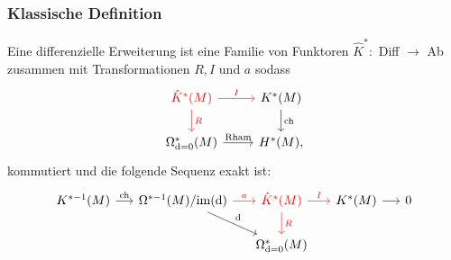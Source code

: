\documentclass[12pt,utf8,notheorems,compress,t]{beamer}
\renewcommand{\_}{\mathpunct{.}}
\newcommand{\?}{\,{:}\,}
\newcommand{\dd}{\textup{d}}
\begin{document}
\begin{frame}\frametitle{Klassische Definition}
    Eine differenzielle Erweiterung ist eine Familie von Funktoren $\hat
    K^*\colon$ Diff $\rightarrow$ Ab zusammen mit Transformationen $R, I$ und
    $a$ sodass
\begin{equation}\begin{tikzcd}[ampersand replacement=\&]
        \textcolor{red}{\hat K^*(M)} \arrow[d,
        "R", red]\arrow[r, "I", red] \& K^*(M)\arrow[d, "\mathrm{ch}"] \\ 
        \Omega^*_{\dd=0}(M) \arrow[r, "\mathrm{Rham}"]\& H^*(M),
\end{tikzcd}\nonumber
\end{equation} \vspace{1em}kommutiert und die folgende Sequenz exakt
ist:\vspace{-2em}
\begin{equation}\begin{tikzcd}[ampersand replacement=\&]
        K^{*-1}(M)\arrow[r, "\mathrm{ch}"]\&[-10pt]\Omega^{*-1}(M) /
        \mathrm{im}(\dd)\ar[dr, "\dd"]\arrow[r, "a", red] \&[-10pt]
        \textcolor{red}{\hat K^*(M)} \arrow[r, "I", red]\ar[d, "R", red]
        \&[-10pt] K^*(M) \arrow[r] \&[-10pt]  0 \\ \&\& \Omega^*_{\dd=0}(M)\&\&
\end{tikzcd}\nonumber
\end{equation}
\end{frame}
%
%    
\end{document}
